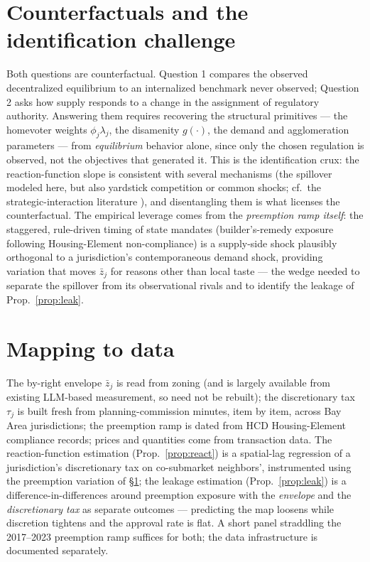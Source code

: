 \documentclass[11pt]{article}
\begin{document}
\section{Counterfactuals and the identification challenge}\label{sec:ident}

Both questions are counterfactual. Question 1 compares the observed decentralized equilibrium to
an internalized benchmark never observed; Question 2 asks how supply responds to a change in the
assignment of regulatory authority. Answering them requires recovering the structural primitives
--- the homevoter weights $\phi_j\lambda_j$, the disamenity $g(\cdot)$, the demand and
agglomeration parameters --- from \emph{equilibrium} behavior alone, since only the chosen
regulation is observed, not the objectives that generated it. This is the identification crux:
the reaction-function slope is consistent with several mechanisms (the spillover modeled here,
but also yardstick competition or common shocks; cf.\ the strategic-interaction literature
\citealp{brueckner1998testing,brueckner2003strategic}), and disentangling them is what licenses
the counterfactual. The empirical leverage comes from the \emph{preemption ramp itself}: the
staggered, rule-driven timing of state mandates (builder's-remedy exposure following
Housing-Element non-compliance) is a supply-side shock plausibly orthogonal to a jurisdiction's
contemporaneous demand shock, providing variation that moves $\bar z_j$ for reasons other than
local taste --- the wedge needed to separate the spillover from its observational rivals and to
identify the leakage of Prop.~\ref{prop:leak}.

\section{Mapping to data}\label{sec:data}

The by-right envelope $\bar z_j$ is read from zoning (and is largely available from existing
LLM-based measurement, so need not be rebuilt); the discretionary tax $\tau_j$ is built fresh
from planning-commission minutes, item by item, across Bay Area jurisdictions; the preemption
ramp is dated from HCD Housing-Element compliance records; prices and quantities come from
transaction data. The reaction-function estimation (Prop.~\ref{prop:react}) is a spatial-lag
regression of a jurisdiction's discretionary tax on co-submarket neighbors', instrumented using
the preemption variation of \S\ref{sec:ident}; the leakage estimation (Prop.~\ref{prop:leak}) is
a difference-in-differences around preemption exposure with the \emph{envelope} and the
\emph{discretionary tax} as separate outcomes --- predicting the map loosens while discretion
tightens and the approval rate is flat. A short panel straddling the 2017--2023 preemption ramp
suffices for both; the data infrastructure is documented separately.
\end{document}
